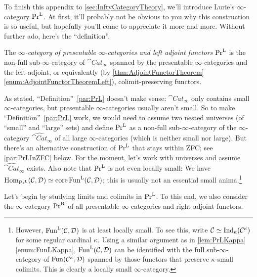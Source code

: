 To finish this appendix to \cref{sec:InftyCategoryTheory}, we'll introduce Lurie's $\infty$-category $\mathrm{Pr}^{\mathrm{L}}$. At first, it'll probably not be obvious to you why this construction is so useful, but hopefully you'll come to appreciate it more and more. Without further ado, here's the \enquote{definition}.
\begin{numpar}\label{par:PrL}
	The \emph{$\infty$-category of presentable $\infty\text{-}$categories and left adjoint functors} $\mathrm{Pr}^{\mathrm{L}}$ is the non-full sub-$\infty$-category of $\cat{Cat}_\infty$ spanned by the presentable $\infty$-categories and the left adjoint, or equivalently (by \cref{thm:AdjointFunctorTheorem}\cref{enum:AdjointFunctorTheoremLeft}), colimit-preserving functors.
\end{numpar}
As stated, \enquote{Definition}~\cref{par:PrL} doesn't make sense: $\cat{Cat}_\infty$ only contains small $\infty$-categories, but presentable $\infty$-categories usually aren't small. So to make \enquote{Definition}~\cref{par:PrL} work, we would need to assume two nested universes (of \enquote{small} and \enquote{large} sets) and define $\mathrm{Pr}^{\mathrm{L}}$ as a  non-full sub-$\infty$-category of the $\infty$-category $\widehat{\cat{Cat}}_\infty$ of all large $\infty$-categories (which is neither small nor large). But there's an alternative construction of $\Pr^{\mathrm{L}}$ that stays within ZFC; see \cref{par:PrLInZFC} below. For the moment, let's work with universes and assume $\widehat{\cat{Cat}}_\infty$ exists. Also note that $\mathrm{Pr}^{\mathrm{L}}$ is not even locally small: We have $\operatorname{Hom}_{\mathrm{Pr}^{\mathrm{L}}}(\mathcal{C},\mathcal{D})\simeq \operatorname{core} \operatorname{Fun}^{\mathrm{L}}(\mathcal{C},\mathcal{D})$; this is usually not an essential small anima.\footnote{However, $\operatorname{Fun}^{\mathrm{L}}(\mathcal{C},\mathcal{D})$ is at least locally small. To see this, write $\mathcal{C}\simeq \mathrm{Ind}_\kappa(\mathcal{C}^\kappa)$ for some regular cardinal $\kappa$. Using a similar argument as in \cref{lem:PrLKappa}\cref{enum:FunLKappa}, $\operatorname{Fun}^{\mathrm{L}}(\mathcal{C},\mathcal{D})$ can be identified with the full sub-$\infty$-category of $\operatorname{Fun}(\mathcal{C}^\kappa,\mathcal{D})$ spanned by those functors that preserve $\kappa$-small colimits. This is clearly a locally small $\infty$-category.} %

Let's begin by studying limits and colimits in $\mathrm{Pr}^{\mathrm{L}}$. To this end, we also consider the $\infty$-category $\mathrm{Pr}^{\mathrm{R}}$ of all presentable $\infty$-categories and right adjoint functors.

